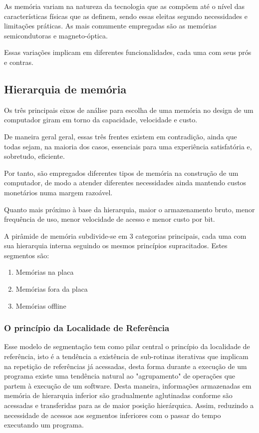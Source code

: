 \documentclass[12pt]{article}
\begin{document}
As memória variam na natureza da tecnologia que as compõem até o nível das características físicas que as definem, sendo essas eleitas segundo necessidades e limitações práticas. As mais comumente empregadas são as memórias semicondutoras e magneto-óptica.

Essas variações implicam em diferentes funcionalidades, cada uma com seus prós e contras.

\subsection{Hierarquia de memória}
Os três principais eixos de análise para escolha de uma memória no design de um computador giram em torno da capacidade, velocidade e custo.

De maneira geral geral, essas três frentes existem em contradição, ainda que todas sejam, na maioria dos casos, essenciais para uma experiência satisfatória e, sobretudo, eficiente.

Por tanto, são empregados diferentes tipos de memória na construção de um computador, de modo a atender diferentes necessidades ainda mantendo custos monetários numa margem razoável. 

Quanto mais próximo à base da hierarquia, maior o armazenamento bruto, menor frequência de uso, menor velocidade de acesso e menor custo por bit.

A pirâmide de memória subdivide-se em 3 categorias principais, cada uma com sua hierarquia interna seguindo os mesmos princípios supracitados. Estes segmentos são:
\begin{enumerate}
    \item Memórias na placa
    \item Memórias fora da placa
    \item Memórias offline
\end{enumerate}

\subsubsection*{O princípio da Localidade de Referência}
Esse modelo de segmentação tem como pilar central o princípio da localidade de referência, isto é a tendência a existência de sub-rotinas iterativas que implicam na repetição de referências já acessadas, desta forma durante a execução de um programa existe uma tendência natural ao "agrupamento" de operações que partem à execução de um software. Desta maneira, informações armazenadas em memória de hierarquia inferior são gradualmente aglutinadas conforme são acessadas e transferidas para as de maior posição hierárquica. Assim, reduzindo a necessidade de acessos aos segmentos inferiores com o passar do tempo executando um programa.
\end{document}
